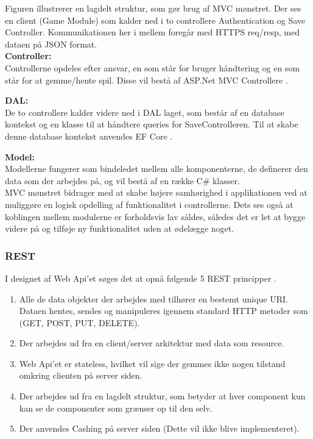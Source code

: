 \noindent Figuren illustrerer en lagdelt struktur, som gør brug af MVC mønstret. Der ses en client (Game Module) som kalder ned i to controllere Authentication og Save Controller. Kommunikationen her i mellem foregår med HTTPS req/resp, med dataen på JSON format.\\

\noindent \textbf{Controller:}\\
Controllerne opdeles efter ansvar, en som står for bruger håndtering og en som står for at gemme/hente spil. Disse vil bestå af ASP.Net MVC Controllere \cite{MVC controller}.

\noindent \textbf{DAL:}\\
De to controllere kalder videre ned i DAL laget, som består af en database kontekst og en klasse til at håndtere queries for SaveControlleren. Til at skabe denne database kontekst anvendes EF Core \cite{EF Core}.

\noindent \textbf{Model:}\\
Modellerne fungerer som bindeledet mellem alle komponenterne, de definerer den data som der arbejdes på, og vil bestå af en række C\# klasser.\\

\noindent MVC mønstret bidrager med at skabe højere samhørighed i applikationen ved at muliggøre en logisk opdelling af funktionalitet i controllerne. Dets ses også at koblingen mellem modulerne er forholdsvis lav såldes, således det er let at bygge videre på og tilføje ny funktionalitet uden at ødelægge noget.\\

\subsubsection{REST}
I designet af Web Api'et søges det at opnå følgende 5 REST principper \cite{REST}.

\begin{enumerate}
 \item Alle de data objekter der arbejdes med tilhører en bestemt unique URI. Dataen hentes, sendes og manipuleres igennem standard HTTP metoder som (GET, POST, PUT, DELETE).
 \item Der arbejdes ud fra en client/server arkitektur med data som resource. 
 \item Web Api’et er stateless, hvilket vil sige der gemmes ikke nogen tilstand omkring clienten på server siden.
 \item Der arbejdes ud fra en lagdelt struktur, som betyder at hver component kun kan se de componenter som grænser op til den selv.
 \item Der anvendes Cashing på server siden (Dette vil ikke blive implementeret).
\end{enumerate}

